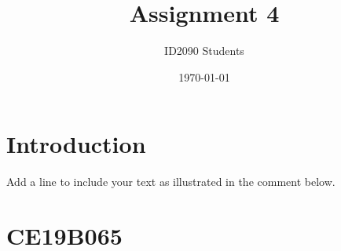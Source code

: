 \documentclass[a4paper, 12pt]{article}
\begin{document}
\title{Assignment 4}
\author{ID2090 Students}
\date{\today}
\maketitle

\tableofcontents

\section{Introduction}
Add a line to include your text as illustrated in the comment below.

% 

\section{CE19B065}

\end{document}
